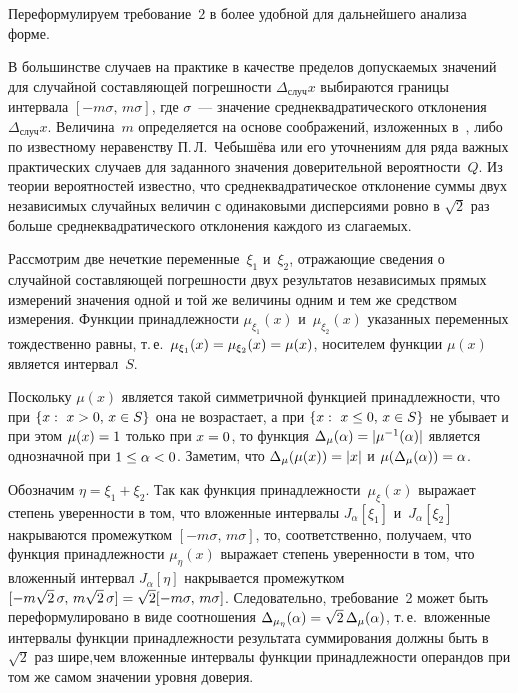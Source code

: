 \begin{multicols}{2}
Переформулируем требование~$2$ в более удобной для дальнейшего 
анализа форме.
  
  В большинстве случаев на практике в качестве пределов допускаемых 
значений для случайной\linebreak
 составляющей погрешности 
$\Delta_{\mathrm{случ}}x$ выбираются границы интервала $[-
m\sigma,\,m\sigma]$, где $\sigma$~--- значение среднеквадратического 
отклонения $\Delta_{\mathrm{случ}}x$. Величина~$m$ определяется на основе 
соображений, изложенных в~\cite{15sem}, либо по известному неравенству 
П.\,Л.~Чебышёва или его уточнениям для ряда важных практических случаев 
для заданного значения доверительной вероятности~$Q$. Из теории 
вероятностей известно, что среднеквадратическое отклонение суммы двух 
независимых случайных величин с одинаковыми дисперсиями ровно в 
$\sqrt{2}$ раз больше среднеквадратического отклонения каждого из 
слагаемых. 
  
  Рассмотрим две нечеткие переменные~$\xi_1$ и~$\xi_2$, отражающие 
сведения о случайной составляющей погрешности двух результатов 
независимых прямых измерений значения одной и той же величины одним и 
тем же средством измерения. Функции принадлежности $\mu_{\xi_1}(x)$ 
и~$\mu_{\xi_2}(x)$ указанных переменных тождественно равны, т.\,е.\ 
$\mu_{\xi_1}(x)\hm=\mu_{\xi_2}(x)\hm=\mu(x)$, носителем функции $\mu(x)$ 
является интервал~$S$. 
  
  Поскольку $\mu(x)$ является такой симметричной функцией 
принадлежности, что при $\{x:\ x\hm>0, \, x\hm\in S\}$ она не возрастает, а при 
$\{x:\ x\hm\leq 0,\, x\hm\in S\}$ не убывает и при этом $\mu(x)\hm=1$ только 
при $x\hm=0$, то функция $\Delta_\mu(\alpha)\hm=\vert \mu^{-1}(\alpha)\vert$ 
является однозначной при $1\hm\leq \alpha\hm <0$. Заметим, что 
$\Delta_\mu(\mu(x))\hm=\vert x\vert$ и $\mu(\Delta_\mu(\alpha))\hm=\alpha$.
  
  Обозначим $\eta =\xi_1+\xi_2$. Так как функция 
принадлежности~$\mu_\xi(x)$ выражает степень уверенности в том, что 
вложенные интервалы $J_\alpha [\xi_1]$ и~$J_\alpha[\xi_2]$ накрываются 
промежутком $[-m\sigma,\,m\sigma]$, то, соответственно, получаем, 
что функция принадлежности $\mu_\eta(x)$ выражает степень уверенности в 
том, что вложенный интервал $J_\alpha[\eta]$ накрывается промежутком $[-
m\sqrt{2}\,\sigma,\, m\sqrt{2}\,\sigma]\hm= \sqrt{2}[-
m\sigma,\,m\sigma]$. Следовательно, требование~2 может быть 
переформулировано в виде соотношения 
$\Delta_{\mu_\eta}(\alpha)\hm=\sqrt{2}\,\Delta_\mu(\alpha)$, т.\,е.\ вложенные 
интервалы функции принадлежности результата суммирования должны быть в 
$\sqrt{2}$ раз шире,\linebreak чем вложенные интервалы функции при\-над\-леж\-ности 
операндов при том же самом значении уровня доверия.
  

\end{multicols}
